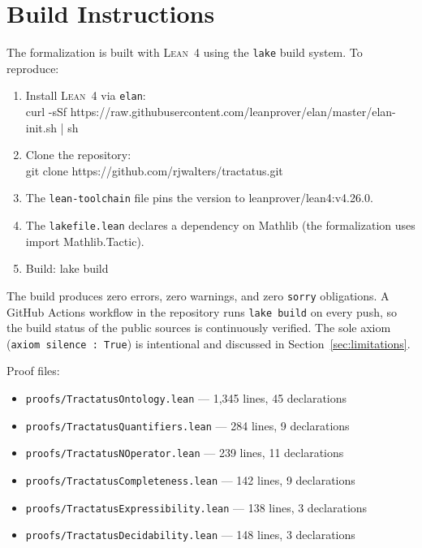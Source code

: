 \documentclass[jsl,bibother]{asl}
\theoremstyle{definition}
\theoremstyle{remark}
\newcommand{\Lean}{\textsc{Lean}}
\begin{document}

\appendix

\section{Build Instructions}
\label{app:build}

The formalization is built with \Lean~4 using the \texttt{lake}
build system.  To reproduce:

\begin{enumerate}[nosep]
  \item Install \Lean~4 via \texttt{elan}:\\
    {\small\ttfamily curl -sSf https://raw.githubusercontent.com/\allowbreak{}leanprover/\allowbreak{}elan/\allowbreak{}master/\allowbreak{}elan-init.sh | sh}
  \item Clone the repository:\\
    {\small\ttfamily git clone https://github.com/rjwalters/tractatus.git}
  \item The \texttt{lean-toolchain} file pins the version to
    {\small\ttfamily leanprover/lean4:v4.26.0}.
  \item The \texttt{lakefile.lean} declares a dependency on
    Mathlib (the formalization uses
    {\small\ttfamily import Mathlib.Tactic}).
  \item Build: {\small\ttfamily lake build}
\end{enumerate}

\noindent
The build produces zero errors, zero warnings, and zero
\texttt{sorry} obligations.  A GitHub Actions workflow in the
repository runs \texttt{lake build} on every push, so the build
status of the public sources is continuously verified.  The sole axiom
(\texttt{axiom silence : True}) is intentional and
discussed in Section~\ref{sec:limitations}.

Proof files:
\begin{itemize}[nosep]
  \item \texttt{proofs/TractatusOntology.lean} --- 1,345 lines, 45 declarations
  \item \texttt{proofs/TractatusQuantifiers.lean} --- 284 lines, 9 declarations
  \item \texttt{proofs/TractatusNOperator.lean} --- 239 lines, 11 declarations
  \item \texttt{proofs/TractatusCompleteness.lean} --- 142 lines, 9 declarations
  \item \texttt{proofs/TractatusExpressibility.lean} --- 138 lines, 3 declarations
  \item \texttt{proofs/TractatusDecidability.lean} --- 148 lines, 3 declarations
\end{itemize}
\end{document}
